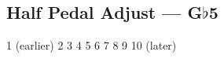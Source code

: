 \subsection[Half Pedal Adjust]{Half Pedal Adjust --- \UiKey{\I}\UiKey{\SET}G$\flat$5}










































1 (earlier)
2
3
4
5
6
7
8
9
10 (later)
